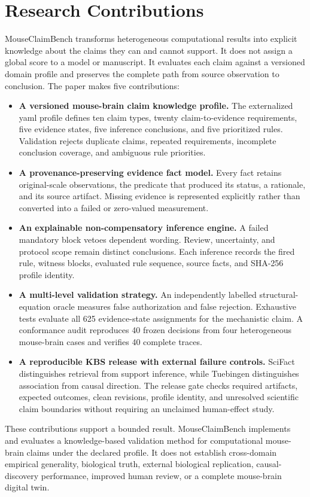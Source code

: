\section{Research Contributions}
\label{sec:contributions}

MouseClaimBench transforms heterogeneous computational results into explicit knowledge about the claims they can and cannot support. It does not assign a global score to a model or manuscript. It evaluates each claim against a versioned domain profile and preserves the complete path from source observation to conclusion. The paper makes five contributions:

\begin{itemize}
    \item \textbf{A versioned mouse-brain claim knowledge profile.} The externalized \ac{yaml} profile defines ten claim types, twenty claim-to-evidence requirements, five evidence states, five inference conclusions, and five prioritized rules. Validation rejects duplicate claims, repeated requirements, incomplete conclusion coverage, and ambiguous rule priorities.

    \item \textbf{A provenance-preserving evidence fact model.} Every fact retains original-scale observations, the predicate that produced its status, a rationale, and its source artifact. Missing evidence is represented explicitly rather than converted into a failed or zero-valued measurement.

    \item \textbf{An explainable non-compensatory inference engine.} A failed mandatory block vetoes dependent wording. Review, uncertainty, and protocol scope remain distinct conclusions. Each inference records the fired rule, witness blocks, evaluated rule sequence, source facts, and SHA-256 profile identity.

    \item \textbf{A multi-level validation strategy.} An independently labelled structural-equation oracle measures false authorization and false rejection. Exhaustive tests evaluate all 625 evidence-state assignments for the mechanistic claim. A conformance audit reproduces 40 frozen decisions from four heterogeneous mouse-brain cases and verifies 40 complete traces.

    \item \textbf{A reproducible KBS release with external failure controls.} SciFact distinguishes retrieval from support inference, while Tuebingen distinguishes association from causal direction. The release gate checks required artifacts, expected outcomes, clean revisions, profile identity, and unresolved scientific claim boundaries without requiring an unclaimed human-effect study.
\end{itemize}

These contributions support a bounded result. MouseClaimBench implements and evaluates a knowledge-based validation method for computational mouse-brain claims under the declared profile. It does not establish cross-domain empirical generality, biological truth, external biological replication, causal-discovery performance, improved human review, or a complete mouse-brain digital twin.
